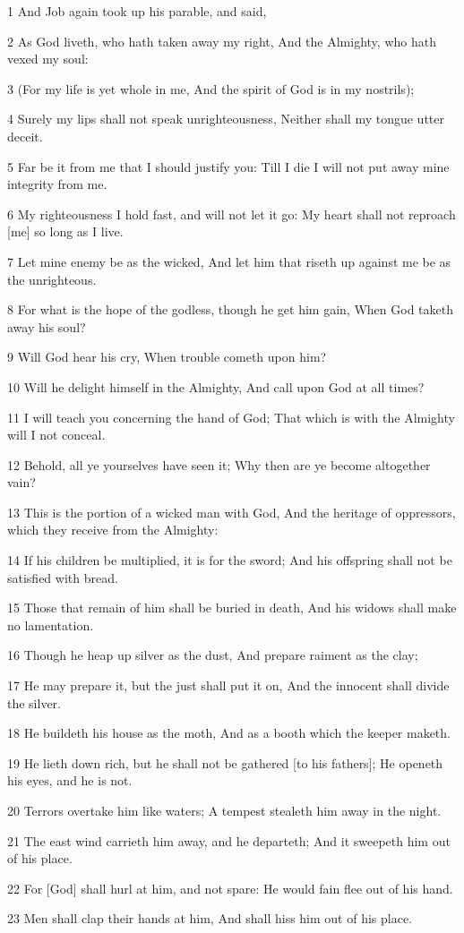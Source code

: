\par 1 And Job again took up his parable, and said,
\par 2 As God liveth, who hath taken away my right, And the Almighty, who hath vexed my soul:
\par 3 (For my life is yet whole in me, And the spirit of God is in my nostrils);
\par 4 Surely my lips shall not speak unrighteousness, Neither shall my tongue utter deceit.
\par 5 Far be it from me that I should justify you: Till I die I will not put away mine integrity from me.
\par 6 My righteousness I hold fast, and will not let it go: My heart shall not reproach [me] so long as I live.
\par 7 Let mine enemy be as the wicked, And let him that riseth up against me be as the unrighteous.
\par 8 For what is the hope of the godless, though he get him gain, When God taketh away his soul?
\par 9 Will God hear his cry, When trouble cometh upon him?
\par 10 Will he delight himself in the Almighty, And call upon God at all times?
\par 11 I will teach you concerning the hand of God; That which is with the Almighty will I not conceal.
\par 12 Behold, all ye yourselves have seen it; Why then are ye become altogether vain?
\par 13 This is the portion of a wicked man with God, And the heritage of oppressors, which they receive from the Almighty:
\par 14 If his children be multiplied, it is for the sword; And his offspring shall not be satisfied with bread.
\par 15 Those that remain of him shall be buried in death, And his widows shall make no lamentation.
\par 16 Though he heap up silver as the dust, And prepare raiment as the clay;
\par 17 He may prepare it, but the just shall put it on, And the innocent shall divide the silver.
\par 18 He buildeth his house as the moth, And as a booth which the keeper maketh.
\par 19 He lieth down rich, but he shall not be gathered [to his fathers]; He openeth his eyes, and he is not.
\par 20 Terrors overtake him like waters; A tempest stealeth him away in the night.
\par 21 The east wind carrieth him away, and he departeth; And it sweepeth him out of his place.
\par 22 For [God] shall hurl at him, and not spare: He would fain flee out of his hand.
\par 23 Men shall clap their hands at him, And shall hiss him out of his place.


